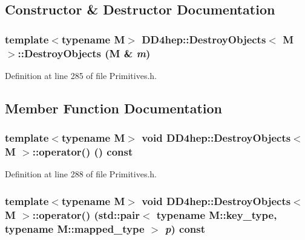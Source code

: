 \subsection{Constructor \& Destructor Documentation}
\hypertarget{class_d_d4hep_1_1_destroy_objects_afa755ee063407e0d37a4906a3a17f855}{
\subsubsection[{DestroyObjects}]{\setlength{\rightskip}{0pt plus 5cm}template$<$typename M$>$ {\bf DD4hep::DestroyObjects}$<$ M $>$::{\bf DestroyObjects} (M \& {\em m})}}
\label{class_d_d4hep_1_1_destroy_objects_afa755ee063407e0d37a4906a3a17f855}


Definition at line 285 of file Primitives.h.

\subsection{Member Function Documentation}
\hypertarget{class_d_d4hep_1_1_destroy_objects_ac47fb46f0197b9845bd9a22e8dced935}{
\subsubsection[{operator()}]{\setlength{\rightskip}{0pt plus 5cm}template$<$typename M$>$ void {\bf DD4hep::DestroyObjects}$<$ M $>$::operator() () const}}
\label{class_d_d4hep_1_1_destroy_objects_ac47fb46f0197b9845bd9a22e8dced935}


Definition at line 288 of file Primitives.h.\hypertarget{class_d_d4hep_1_1_destroy_objects_a59349f8bf81d99126b07646492e99134}{
\subsubsection[{operator()}]{\setlength{\rightskip}{0pt plus 5cm}template$<$typename M$>$ void {\bf DD4hep::DestroyObjects}$<$ M $>$::operator() (std::pair$<$ typename M::key\_\-type, typename M::mapped\_\-type $>$ {\em p}) const}}
\label{class_d_d4hep_1_1_destroy_objects_a59349f8bf81d99126b07646492e99134}


